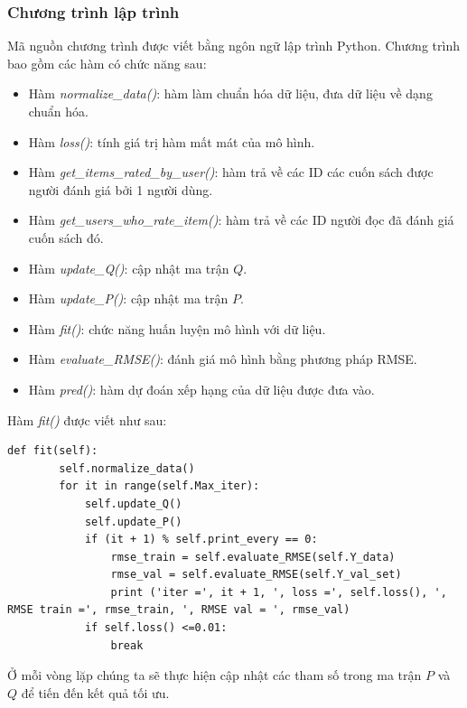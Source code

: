 \subsubsection{Chương trình lập trình}
Mã nguồn chương trình được viết bằng ngôn ngữ lập trình Python. Chương trình bao gồm các hàm có chức năng sau:
\begin{itemize}
    \item Hàm \textit{normalize\_data()}: hàm làm chuẩn hóa dữ liệu, đưa dữ liệu về dạng chuẩn hóa.
    \item Hàm \textit{loss()}: tính giá trị hàm mất mát của mô hình.
    \item Hàm \textit{get\_items\_rated\_by\_user()}: hàm trả về các ID các cuốn sách được người đánh giá bởi 1 người dùng.
    \item Hàm \textit{get\_users\_who\_rate\_item()}: hàm trả về các ID người đọc đã đánh giá cuốn sách đó.
    \item Hàm \textit{update\_Q()}: cập nhật ma trận $Q$.
    \item Hàm \textit{update\_P()}: cập nhật ma trận $P$.
    \item Hàm \textit{fit()}: chức năng huấn luyện mô hình với dữ liệu.
    \item Hàm \textit{evaluate\_RMSE()}: đánh giá mô hình bằng phương pháp RMSE.
    \item Hàm \textit{pred()}: hàm dự đoán xếp hạng của dữ liệu được đưa vào.
\end{itemize}
Hàm \textit{fit()} được viết như sau:
\begin{lstlisting}
def fit(self):
        self.normalize_data()
        for it in range(self.Max_iter):
            self.update_Q()
            self.update_P()
            if (it + 1) % self.print_every == 0:
                rmse_train = self.evaluate_RMSE(self.Y_data)
                rmse_val = self.evaluate_RMSE(self.Y_val_set)
                print ('iter =', it + 1, ', loss =', self.loss(), ', RMSE train =', rmse_train, ', RMSE val = ', rmse_val)
            if self.loss() <=0.01:
                break
\end{lstlisting}
Ở mỗi vòng lặp chúng ta sẽ thực hiện cập nhật các tham số trong ma trận $P$ và $Q$ để tiến đến kết quả tối ưu.
